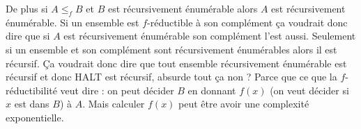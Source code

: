 \begin{mcqs}
{  De plus si $A \leq_f B$ et $B$ est récursivement énumérable alors $A$ est récursivement énumérable.
  Si un ensemble est $f$-réductible à son complément ça voudrait donc dire que si $A$ est récursivement énumérable son complément l'est aussi.
  Seulement si un ensemble et son complément sont récursivement énumérables alors il est récursif.
  Ça voudrait donc dire que tout ensemble récursivement énumérable est récursif et donc HALT est récursif, absurde tout ça non ?}
  {Parce que ce que la $f$-réductibilité veut dire : on peut décider $B$ en donnant $f(x)$ (on veut décider si $x$ est dans $B$) à $A$.
  Mais calculer $f(x)$ peut être avoir une complexité exponentielle.}
\end{mcqs}
